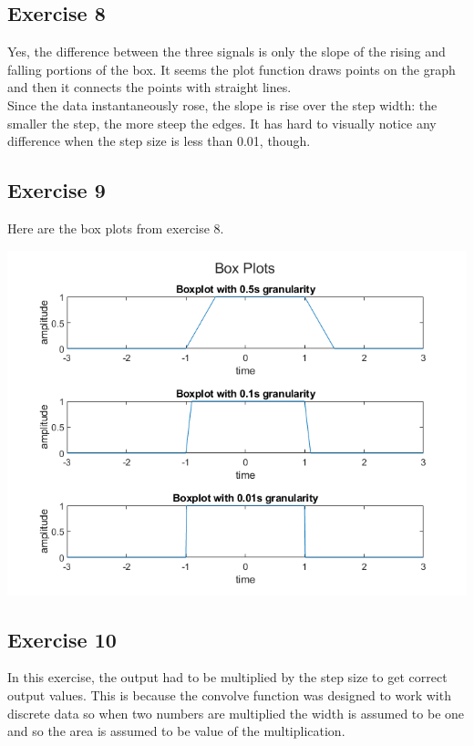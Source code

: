 \documentclass[11pt]{article}
\begin{document}
\subsection{Exercise 8}

Yes, the difference between the three signals is only the slope of the rising and falling portions of the box.
It seems the plot function draws points on the graph and then it connects the points with straight lines.\\

Since the data instantaneously rose, the slope is rise over the step width: the smaller the step, the more steep the edges.
It has hard to visually notice any difference when the step size is less than 0.01, though.\\



\pagebreak
\subsection{Exercise 9}

Here are the box plots from exercise 8.

\includegraphics[width=\textwidth]{exercise8.png}

\subsection{Exercise 10}

In this exercise, the output had to be multiplied by the step size to get correct output values.
This is because the convolve function was designed to work with discrete data so when two numbers are multiplied the width is assumed to be one and so the area is assumed to be value of the multiplication.\\
\end{document}

